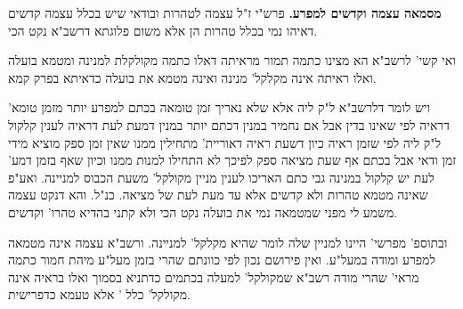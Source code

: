 \documentclass[12pt, openany]{book}
\newcommand{\sethebfont}{
\fontsize{10.5pt}{21.0pt} \selectfont
}
\newcommand{\twocol}[1]{
	{\sethebfont \begin{multicols}{2}
			#1
	\end{multicols}}	
}
\begin{document}
\twocol{\textbf{מסמאה עצמה וקדשים למפרע.}  פרש"י ז"ל עצמה לטהרות ובודאי שיש בכלל עצמה קדשים דאיהו נמי בכלל טהרות הן אלא משום פלוגתא דרשב"א נקט הכי.\par  ואי קשי' לרשב"א הא מצינו כתמה תמור מראיתה דאלו כתמה מקולקלת למנינה ומטמא בועלה ואלו ראיתה אינה מקלקל' מנינה ואינה מטמא את בועלה כדאיתא בפרק קמא.\par ויש לומר דלרשב"א ל"ק ליה אלא שלא נאריך זמן טומאה בכתם למפרע יותר מזמן טומא' דראיה לפי שאינו בדין אבל אם נחמיר במנין דכתם יותר במנין דמעת לעת דראיה לענין קלקול ל"ק ליה לפי שזמן ראיה כיון דשעת ראיה דאוריית' מתחילין ממנו שאין זמן ספק מוציא מידי זמן ודאי אבל בכתם אף שעת מציאה ספק לפיכך לא התחילו למנות ממנו וכיון שאף בזמן דמע' לעת יש קלקול במנינה גבי כתם האריכו לענין מניין מקולקל' משעת הכבוס למניינה. ואע"פ שאינה מטמא טהרות ולא קדשים אלא עד מעת לעת של מציאה. כנ"ל. והא דנקט עצמה משמע לי מפני שמטמאה נמי את בועלה נקט הכי ולא קתני בהדיא טהרו' וקדשים.\par ובתוספ' מפרשי' היינו למניין שלה לומר שהיא מקלקל' למניינה. ורשב"א עצמה אינה מטמאה למפרע ומודה במעל"ע. ואין פירושם נכון לפי כוונתם שהרי בזמן מעל"ע מיהת חמור כתמה מראי' שהרי מודה רשב"א שמקולקל' למעלה בכתמים כדתניא בסמוך ואלו בראיה אינה מקולקל' כלל ' אלא טעמא כדפרישית. 
}
\end{document}
